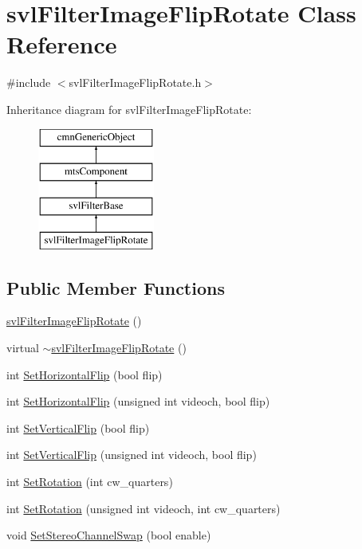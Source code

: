 \hypertarget{classsvl_filter_image_flip_rotate}{}\section{svl\+Filter\+Image\+Flip\+Rotate Class Reference}
\label{classsvl_filter_image_flip_rotate}


{\ttfamily \#include $<$svl\+Filter\+Image\+Flip\+Rotate.\+h$>$}

Inheritance diagram for svl\+Filter\+Image\+Flip\+Rotate\+:\begin{figure}[H]
\begin{center}
\leavevmode
\includegraphics[height=4.000000cm]{db/d13/classsvl_filter_image_flip_rotate}
\end{center}
\end{figure}
\subsection*{Public Member Functions}
\begin{DoxyCompactItemize}
\item 
\hyperlink{classsvl_filter_image_flip_rotate_ab379e8505822377250bea77bc6851f34}{svl\+Filter\+Image\+Flip\+Rotate} ()
\item 
virtual \hyperlink{classsvl_filter_image_flip_rotate_ae90457d63160857f818ba5952f4568a0}{$\sim$svl\+Filter\+Image\+Flip\+Rotate} ()
\item 
int \hyperlink{classsvl_filter_image_flip_rotate_a607a8c052166c06c9bd70c7ff5def50e}{Set\+Horizontal\+Flip} (bool flip)
\item 
int \hyperlink{classsvl_filter_image_flip_rotate_a63abf3dc9d7d07d09965c04192261080}{Set\+Horizontal\+Flip} (unsigned int videoch, bool flip)
\item 
int \hyperlink{classsvl_filter_image_flip_rotate_ad0b482634c2496543b12481ea3a58348}{Set\+Vertical\+Flip} (bool flip)
\item 
int \hyperlink{classsvl_filter_image_flip_rotate_a10d1b928454a9d3be595ad9150449aac}{Set\+Vertical\+Flip} (unsigned int videoch, bool flip)
\item 
int \hyperlink{classsvl_filter_image_flip_rotate_a2aeda68e2a3e158c88fde836b4d66143}{Set\+Rotation} (int cw\+\_\+quarters)
\item 
int \hyperlink{classsvl_filter_image_flip_rotate_adfa2517f9040fcc09661aef1a6280964}{Set\+Rotation} (unsigned int videoch, int cw\+\_\+quarters)
\item 
void \hyperlink{classsvl_filter_image_flip_rotate_a040fd1fe8661d10d546ddec0f3ef5fb9}{Set\+Stereo\+Channel\+Swap} (bool enable)
\end{DoxyCompactItemize}
